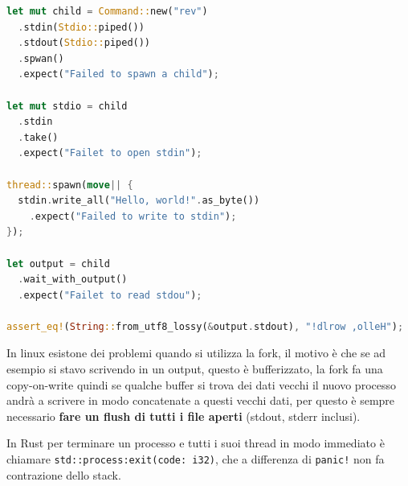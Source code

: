 \documentclass[12pt]{article}
\begin{document}
\begin{lstlisting}[language=rust]
let mut child = Command::new("rev")
  .stdin(Stdio::piped())
  .stdout(Stdio::piped())
  .spwan()
  .expect("Failed to spawn a child");

let mut stdio = child
  .stdin
  .take()
  .expect("Failet to open stdin");

thread::spawn(move|| {
  stdin.write_all("Hello, world!".as_byte())
    .expect("Failed to write to stdin");
});

let output = child
  .wait_with_output()
  .expect("Failet to read stdou");

assert_eq!(String::from_utf8_lossy(&output.stdout), "!dlrow ,olleH");
\end{lstlisting}
In linux esistone dei problemi quando si utilizza la fork, il motivo \`e che se ad esempio si stavo scrivendo in un output, questo \`e bufferizzato, la fork fa una copy-on-write quindi se qualche buffer si trova dei dati vecchi il nuovo processo andr\`a a scrivere in modo concatenate a questi vecchi dati, per questo \`e sempre necessario \textbf{fare un flush di tutti i file aperti} (stdout, stderr inclusi).

In Rust per terminare un processo e tutti i suoi thread in modo immediato \`e chiamare \texttt{std::process:exit(code: i32)}, che a differenza di \texttt{panic!} non fa contrazione dello stack.
\end{document}
